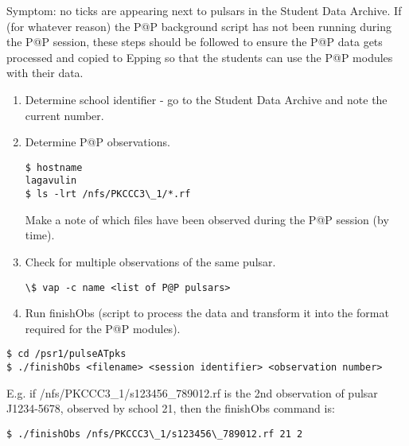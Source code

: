 \documentclass{article}
\begin{document}
Symptom: no ticks are appearing next to pulsars in the Student Data Archive. If (for whatever reason) the P@P background script has not been running during the P@P session, these steps should be followed to ensure the P@P data gets processed and copied to Epping so that the students can use the P@P modules with their data.

\begin{enumerate}
\item Determine school identifier - go to the Student Data Archive and note the current number.
\item Determine P@P observations.
\begin{verbatim}
$ hostname
lagavulin
$ ls -lrt /nfs/PKCCC3\_1/*.rf
\end{verbatim}

Make a note of which files have been observed during the P@P session (by time).

\item Check for multiple observations of the same pulsar.
\begin{verbatim}
\$ vap -c name <list of P@P pulsars>
\end{verbatim}

\item Run finishObs (script to process the data and transform it into the format required for the P@P modules).
\end{enumerate}

\begin{verbatim}
$ cd /psr1/pulseATpks
$ ./finishObs <filename> <session identifier> <observation number>
\end{verbatim}
E.g. if /nfs/PKCCC3\_1/s123456\_789012.rf is the 2nd observation of pulsar J1234-5678, observed by school 21, then the finishObs command is:
\begin{verbatim}
$ ./finishObs /nfs/PKCCC3\_1/s123456\_789012.rf 21 2
\end{verbatim}
\end{document}
